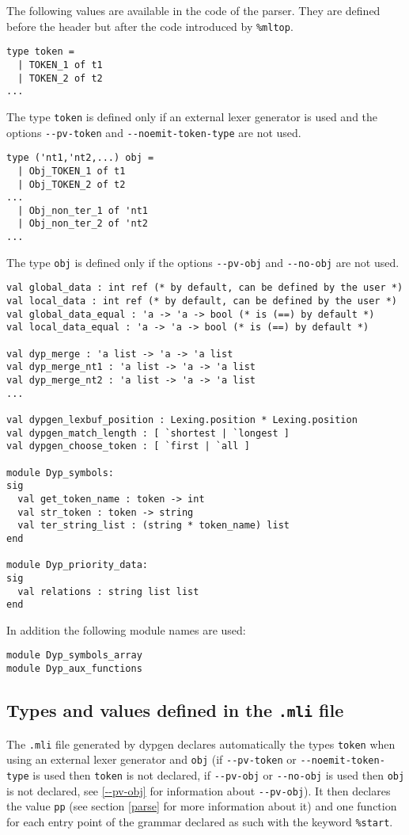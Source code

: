 \documentclass[12pt]{article}
\begin{document}
{The following values are available in the code of the parser. They are defined before the header but after the code introduced by \verb|%mltop|.
\begin{verbatim}
type token =
  | TOKEN_1 of t1
  | TOKEN_2 of t2
...
\end{verbatim}
The type \verb|token| is defined only if an external lexer generator is used and the options \verb|--pv-token| and \verb|--noemit-token-type| are not used.
\begin{verbatim}
type ('nt1,'nt2,...) obj =
  | Obj_TOKEN_1 of t1
  | Obj_TOKEN_2 of t2
...
  | Obj_non_ter_1 of 'nt1
  | Obj_non_ter_2 of 'nt2
...
\end{verbatim}
The type \verb|obj| is defined only if the options \verb|--pv-obj| and \verb|--no-obj| are not used.
\begin{verbatim}
val global_data : int ref (* by default, can be defined by the user *)
val local_data : int ref (* by default, can be defined by the user *)
val global_data_equal : 'a -> 'a -> bool (* is (==) by default *)
val local_data_equal : 'a -> 'a -> bool (* is (==) by default *)

val dyp_merge : 'a list -> 'a -> 'a list
val dyp_merge_nt1 : 'a list -> 'a -> 'a list
val dyp_merge_nt2 : 'a list -> 'a -> 'a list
...

val dypgen_lexbuf_position : Lexing.position * Lexing.position
val dypgen_match_length : [ `shortest | `longest ]
val dypgen_choose_token : [ `first | `all ]

module Dyp_symbols:
sig
  val get_token_name : token -> int
  val str_token : token -> string
  val ter_string_list : (string * token_name) list
end

module Dyp_priority_data:
sig
  val relations : string list list
end
\end{verbatim}

In addition the following module names are used:
\begin{verbatim}
module Dyp_symbols_array
module Dyp_aux_functions
\end{verbatim}

\subsection{Types and values defined in the \texttt{.mli} file}

The \verb|.mli| file generated by dypgen declares automatically the types \verb|token| when using an external lexer generator and \verb|obj| (if \verb|--pv-token| or \verb|--noemit-token-type| is used then \verb|token| is not declared, if \verb|--pv-obj| or \verb|--no-obj| is used then \verb|obj| is not declared, see \ref{--pv-obj} for information about \verb|--pv-obj|). It then declares the value \verb|pp| (see section \ref{parse} for more information about it) and one function for each entry point of the grammar declared as such with the keyword \verb|%start|.\\

}
\end{document}
